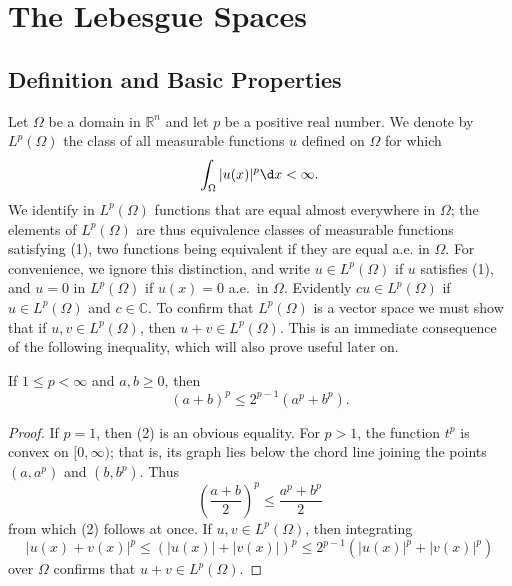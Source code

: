 \chapter[The Lebesgue Spaces \texorpdfstring{$L^p(\Omega)$}{L\textasciicircum p(Ω)}]%
  {The Lebesgue Spaces }


\section{Definition and Basic Properties}

\begin{para}
  Let $\Omega$ be a domain in $\mathbb{R}^n$ and let $p$ be a positive
  real number. We denote by $L^p(\Omega)$ the class of all measurable
  functions $u$ defined on $\Omega$ for which
  \begin{equation}\label{eq:2.1}
    \int_{\Omega} |u(x)|^p \d x < \infty.
  \end{equation}
  We identify in $L^p(\Omega)$ functions that are equal almost everywhere in $\Omega$;
  the elements of $L^p(\Omega)$ are thus equivalence classes of measurable functions satisfying (1),
  two functions being equivalent if they are equal a.e. in $\Omega$. For convenience,
  we ignore this distinction, and write $u \in L^p(\Omega)$ if $u$ satisfies (1), and $u=0$ in $L^p(\Omega)$
  if $u(x)=0$ a.e.~in $\Omega$. Evidently $c u \in L^p(\Omega)$ if $u \in L^p(\Omega)$ and $c \in \mathbb{C}$. 
  To confirm that $L^p(\Omega)$ is a vector space we must show that if $u, v \in L^p(\Omega)$,
  then $u+v \in L^p(\Omega)$. This is an immediate consequence of the following inequality,
  which will also prove useful later on.
\end{para}


\begin{lemma}
  If $1 \leq p<\infty$ and $a, b \geq 0$, then
  \begin{equation}\label{eq:2.2}
    (a+b)^p \leq 2^{p-1}\left(a^p+b^p\right) .
  \end{equation}
\end{lemma}

\begin{proof}
  If $p=1$, then (2) is an obvious equality. For $p>1$, the function $t^p$ is convex on $[0, \infty)$;
  that is, its graph lies below the chord line joining the points
  $\left(a, a^p\right)$ and $\left(b, b^p\right)$. Thus
  \[
  \left(\frac{a+b}{2}\right)^p \leq \frac{a^p+b^p}{2}
  \]
  from which (2) follows at once.
  If $u, v \in L^p(\Omega)$, then integrating
  \[
  |u(x)+v(x)|^p \leq(|u(x)|+|v(x)|)^p \leq 2^{p-1}\left(|u(x)|^p+|v(x)|^p\right)
  \]
  over $\Omega$ confirms that $u+v \in L^p(\Omega)$.
\end{proof}

